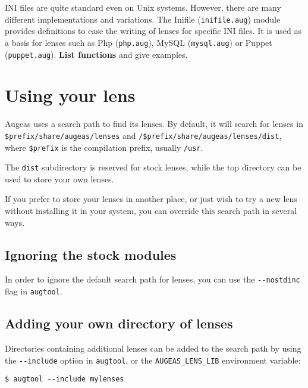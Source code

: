 INI files are quite standard even on Unix systems. However, there are many different implementations and variations. The Inifile (\verb!inifile.aug!) module provides definitions to ease the writing of lenses for specific INI files. It is used as a basis for lenses such as Php (\verb!php.aug!), MySQL (\verb!mysql.aug!) or Puppet (\verb!puppet.aug!). \textbf{List functions} and give examples.

\section{Using your lens}

Augeas uses a search path to find its lenses. By default, it will search for lenses in \verb!$prefix/share/augeas/lenses! and \verb!/$prefix/share/augeas/lenses/dist!, where \verb!$prefix! is the compilation prefix, usually \verb!/usr!.

The \verb!dist! subdirectory is reserved for stock lenses, while the top directory can be used to store your own lenses.

If you prefer to store your lenses in another place, or just wish to try a new lens without installing it in your system, you can override this search path in several ways.

\subsection{Ignoring the stock modules}


In order to ignore the default search path for lenses, you can use the \verb!--nostdinc! flag in \verb!augtool!.

\subsection{Adding your own directory of lenses}

 

Directories containing additional lenses can be added to the search path by using the \verb!--include! option in \verb!augtool!, or the \verb!AUGEAS_LENS_LIB! environment variable:

\begin{verbatim}
$ augtool --include mylenses
\end{verbatim}


